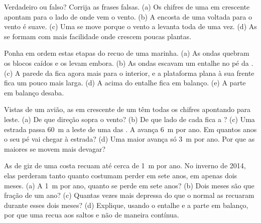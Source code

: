 \begin{exercise}[$\star$]\label{exo:g9:landforms:3}
Verdadeiro ou falso? Corrija as frases falsas. (a) Os chifres de uma 
em crescente apontam para o lado de onde vem o vento. (b) A encosta de
uma  voltada para o vento é suave. (c) Uma  se move porque o
vento a levanta toda de uma vez. (d) As  se formam com mais
facilidade onde crescem poucas plantas.
\end{exercise}

\begin{exercise}[$\star$]\label{exo:g9:landforms:4}
Ponha em ordem estas etapas do recuo de uma  marinha. (a) As ondas
quebram os blocos caídos e os levam embora. (b) As ondas escavam um
entalhe no pé da . (c) A parede da  fica agora mais para o
interior, e a plataforma plana à sua frente fica um pouco mais larga. (d)
A  acima do entalhe fica em balanço. (e) A parte em balanço desaba.
\end{exercise}

\begin{exercise}[$\star\star$]\label{exo:g9:landforms:5}
Vistas de um avião, as  em crescente de um  têm todas os
chifres apontando para leste. (a) De que direção sopra o vento? (b) De
que lado de cada  fica a ? (c) Uma estrada passa
\qty{60}{m} a leste de uma das . A  avança \qty{6}{m} por ano. Em
quantos anos o seu pé vai chegar à estrada? (d) Uma  maior avança só
\qty{3}{m} por ano. Por que as  maiores se movem mais devagar?
\end{exercise}

\begin{exercise}[$\star\star$]\label{exo:g9:landforms:6}
As  de giz de uma costa recuam até cerca de \qty{1}{m} por ano.
No inverno de 2014, elas perderam tanto quanto costumam perder em sete
anos, em apenas dois meses. (a) A \qty{1}{m} por ano, quanto se perde em
sete anos? (b) Dois meses são que fração de um ano? (c) Quantas vezes
mais depressa do que o normal as  recuaram durante esses dois
meses? (d) Explique, usando o entalhe e a parte em balanço, por que uma
 recua aos saltos e não de maneira contínua.
\end{exercise}

